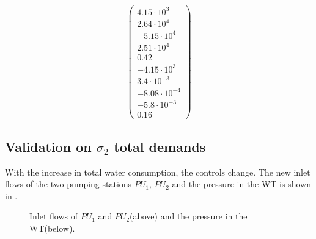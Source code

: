 \begin{equation}
          \begin{pmatrix}
           4.15 \cdot 10^{3} \\
            2.64 \cdot 10^{4} \\
             -5.15 \cdot 10^{4} \\
              2.51 \cdot 10^{4} \\
               0.42 \\
                -4.15 \cdot 10^{3} \\
                  3.4 \cdot 10^{-3} \\
                   -8.08 \cdot 10^{-4} \\
                   -5.8 \cdot 10^{-3} \\
                    0.16 

         \end{pmatrix}
\end{equation}

 \subsection{Validation on $\sigma_2$ total demands}
 \label{validation_sigma1}

 With the increase in total water consumption, the controls change. The new inlet flows of the two pumping stations $PU_1$, $PU_2$ and the pressure in the WT is shown in .

\vspace{-2mm}

 \begin{figure}[H]
 \centering
  
 \vspace{-2.5mm}
 \label{fig:dk_sigma2}
 \end{figure}

 \vspace{-6.5mm}

 \begin{figure}[H]
 \centering
 \hspace{-3.5mm}
  
 \vspace{-2.5mm}
 \caption{Inlet flows of $PU_1$ and $PU_2$(above) and the pressure in the WT(below).}
 \label{fig:WT_sigma2}
 \end{figure}


